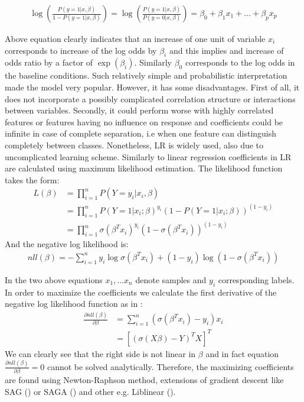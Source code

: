 \documentclass[shortabstract, english, mgr]{iithesis}
\begin{document}
\begin{align*}
    \log \left(\frac{P(y=1| x, \beta)}{1-P(y=1| x, \beta)}\right)=\log \left(\frac{P(y=1| x, \beta)}{P(y=0| x, \beta)}\right)=\beta_{0}+\beta_{1} x_{1}+\ldots+\beta_{p} x_{p}
\end{align*}

Above equation clearly indicates that an increase of one unit of variable $x_i$ corresponds to increase of the log odds by $\beta_i$ and this implies and increase of odds ratio by a factor of $\exp(\beta_i)$. Similarly $\beta_0$ corresponds to the log odds in the baseline conditions. Such relatively simple and probabilistic interpretation made the model very popular. However, it has some disadvantages. First of all, it does not incorporate a possibly complicated correlation structure or interactions between variables. Secondly, it could perform worse with highly correlated features or features having no influence on response and coefficients could be infinite in case of complete separation, i.e when one feature can distinguish completely between classes. Nonetheless, LR is widely used, also due to uncomplicated learning scheme. Similarly to linear regression coefficients in LR are calculated using maximum likelihood estimation. The likelihood function takes the form:
\begin{align*}
    L(\beta) &= \prod_{i=1}^n P(Y=y_i | x_i, \beta) \\&= \prod_{i=1}^n P(Y=1 | x_i ; \beta)^{y_i}(1-P(Y=1 | x_i ; \beta))^{\left(1-y_i\right)} \\
&= \prod_{i=1}^n \sigma\left(\beta^{T} x_i\right)^{y_i}\left(1-\sigma\left(\beta^{T} x_i\right)\right)^{\left(1-y_i\right)}
\end{align*}
And the negative log likelihood is:
\begin{align*}
    nll(\beta)=-\sum_{i=1}^{n} y_i \log \sigma\left(\beta^{T} x_i\right)+\left(1-y_i\right) \log \left(1-\sigma\left(\beta^{T} x_i\right)\right)
\end{align*}

In the two above equations $x_1, \ldots x_n$ denote samples and $y_i$ corresponding labels. In order to maximize the coefficients we calculate the first derivative of the negative log likelihood function as in \cite[chapter 4.4.1]{ESL2}:
\begin{align*}
    \frac{\partial nll(\beta)}{\partial \beta}&=\sum_{i=1}^{n}\left(\sigma\left(\beta^{T} x_i\right)-y_i\right) x_i\\ &=
    \left[\left(\sigma(X\beta) - Y\right)^TX\right]^T
\end{align*}
We can clearly see that the right side is not linear in $\beta$ and in fact equation $\frac{\partial nll(\beta)}{\partial \beta} = 0$ cannot be solved analytically. Therefore, the maximizing coefficients are found using Newton-Raphson method, extensions of gradient descent like SAG (\cite{sag}) or SAGA (\cite{saga}) and other e.g. Liblinear (\cite{liblinear}). 
\end{document}
